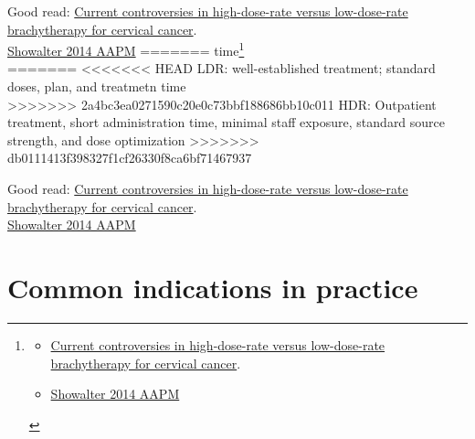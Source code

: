 \documentclass[]{book}
\providecommand{\tightlist}{%
  \setlength{\itemsep}{0pt}\setlength{\parskip}{0pt}}
\let\rmarkdownfootnote\footnote%
\def\footnote{\protect\rmarkdownfootnote}
\theoremstyle{definition}
\theoremstyle{definition}
\theoremstyle{definition}
\theoremstyle{remark}
\begin{document}
Good read: \href{https://www.ncbi.nlm.nih.gov/pubmed/16874815}{Current
controversies in high-dose-rate versus low-dose-rate brachytherapy for
cervical cancer}.\\
\href{https://www.aapm.org/education/vl/vl.asp?id=3911\%5D}{Showalter
2014 AAPM}
=======
time\footnote{\begin{itemize}
  \tightlist
  \item
    \href{https://www.ncbi.nlm.nih.gov/pubmed/16874815}{Current
    controversies in high-dose-rate versus low-dose-rate brachytherapy
    for cervical cancer}.
  \item
    \href{https://www.aapm.org/education/vl/vl.asp?id=3911\%5D}{Showalter
    2014 AAPM}
  \end{itemize}}\\
=======
\textless{}\textless{}\textless{}\textless{}\textless{}\textless{}\textless{}
HEAD LDR: well-established treatment; standard doses, plan, and
treatmetn time\\
>>>>>>> 2a4bc3ea0271590c20e0c73bbf188686bb10c011
HDR: Outpatient treatment, short administration time, minimal staff
exposure, standard source strength, and dose optimization
>>>>>>> db0111413f398327f1cf26330f8ca6bf71467937

Good read: \href{https://www.ncbi.nlm.nih.gov/pubmed/16874815}{Current
controversies in high-dose-rate versus low-dose-rate brachytherapy for
cervical cancer}.\\
\href{https://www.aapm.org/education/vl/vl.asp?id=3911\%5D}{Showalter
2014 AAPM}

\section{Common indications in
practice}\label{common-indications-in-practice}
\end{document}

